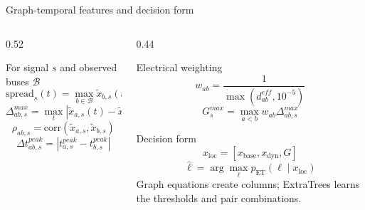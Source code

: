 ﻿\documentclass[10pt,aspectratio=169]{beamer}
\begin{document}
\fi
\begin{frame}{Graph-temporal features and decision form}
\small
\begin{columns}[T,totalwidth=\textwidth]
\begin{column}{0.52\textwidth}
\begin{block}{For signal $s$ and observed buses $\mathcal{B}$}
\[
\mathrm{spread}_s(t)=
\max_{b\in\mathcal{B}}\tilde{x}_{b,s}(t)
-
\min_{b\in\mathcal{B}}\tilde{x}_{b,s}(t)
\]
\[
\Delta_{ab,s}^{max}=\max_t|\tilde{x}_{a,s}(t)-\tilde{x}_{b,s}(t)|
\]
\[
\rho_{ab,s}=\mathrm{corr}(\tilde{x}_{a,s},\tilde{x}_{b,s})
\]
\[
\Delta t^{peak}_{ab,s}=
\left|t^{peak}_{a,s}-t^{peak}_{b,s}\right|
\]
\end{block}
\end{column}
\begin{column}{0.44\textwidth}
\begin{alertblock}{Electrical weighting}
\[
w_{ab}=\frac{1}{\max(d^{eff}_{ab},10^{-5})}
\]
\[
G_s^{max}=\max_{a<b}
w_{ab}\Delta_{ab,s}^{max}
\]
\end{alertblock}
\begin{exampleblock}{Decision form}
\[
x_{\mathrm{loc}}=[x_{\mathrm{base}},x_{\mathrm{dyn}},G]
\]
\[
\hat{\ell}=\arg\max_{\ell}p_{\mathrm{ET}}(\ell\mid x_{\mathrm{loc}})
\]
Graph equations create columns; ExtraTrees learns the thresholds and pair combinations.
\end{exampleblock}
\end{column}
\end{columns}
\end{frame}
\end{document}
